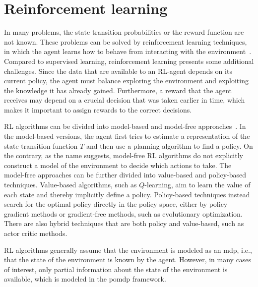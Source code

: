 
\section{Reinforcement learning}
In many problems, the state transition probabilities or the reward function are not known. These problems can be solved by reinforcement learning techniques, in which the agent learns how to behave from interacting with the environment~\cite[Ch. 5]{Kochenderfer2015}. Compared to supervised learning, reinforcement learning presents some additional challenges. Since the data that are available to an RL-agent depends on its current policy, the agent must balance exploring the environment and exploiting the knowledge it has already gained. Furthermore, a reward that the agent receives may depend on a crucial decision that was taken earlier in time, which makes it important to assign rewards to the correct decisions.

RL algorithms can be divided into model-based and model-free approaches~\cite[Ch. 5]{Kochenderfer2015}. In the model-based versions, the agent first tries to estimate a representation of the state transition function $T$ and then use a planning algorithm to find a policy. On the contrary, as the name suggests, model-free RL algorithms do not explicitly construct a model of the environment to decide which actions to take. 
The model-free approaches can be further divided into value-based and policy-based techniques. Value-based algorithms, such as $Q$-learning, aim to learn the value of each state and thereby implicitly define a policy. Policy-based techniques instead search for the optimal policy directly in the policy space, either by policy gradient methods or gradient-free methods, such as evolutionary optimization. There are also hybrid techniques that are both policy and value-based, such as actor critic methods.

RL algorithms generally assume that the environment is modeled as an \gls{mdp}, i.e., that the state of the environment is known by the agent. However, in many cases of interest, only partial information about the state of the environment is available, which is modeled in the \gls{pomdp} framework. %

